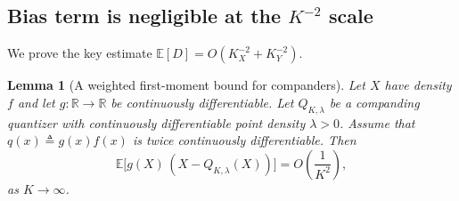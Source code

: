 \documentclass{article}
\newtheorem{lemma}{Lemma}
\newcommand{\E}{\mathbb{E}}
\newcommand{\R}{\mathbb{R}}
\newcommand{\defeq}{\triangleq}
\begin{document}
\subsection{Bias term is negligible at the $K^{-2}$ scale}\label{app:bias_negligible}
We prove the key estimate $\E[D]=O(K_X^{-2}+K_Y^{-2})$.

\begin{lemma}[A weighted first-moment bound for companders]\label{lem:first_moment}
Let $X$ have density $f$ and let $g:\R\to\R$ be continuously differentiable. Let $Q_{K,\lambda}$ be a companding quantizer with continuously differentiable point density $\lambda>0$.
Assume that $q(x)\defeq g(x)f(x)$ is twice continuously differentiable.
Then
\begin{equation}\label{eq:first_moment_order}
\E\big[g(X)\,(X-Q_{K,\lambda}(X))\big]=O\!\left(\frac{1}{K^2}\right),
\end{equation}
as $K\to\infty$.
\end{lemma}
\end{document}
